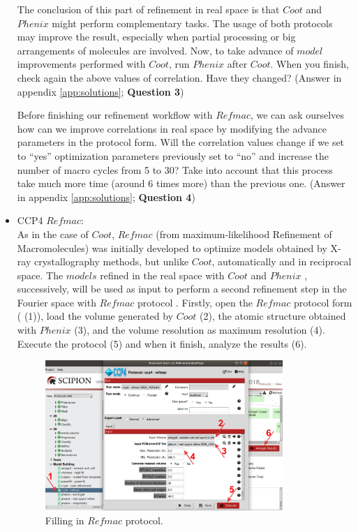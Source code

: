 \begin{itemize}
  The conclusion of this part of refinement in real space is that $Coot$ and $Phenix$  might perform complementary tasks. The usage of both protocols may improve the result, especially when partial processing or big arrangements of molecules are involved. Now, to take advance of $model$ improvements performed with $Coot$, run $Phenix$  after $Coot$. When you finish, check again the above values of correlation. Have they changed? (Answer in appendix \ref{app:solutions}; \textbf{Question 3})
  
  Before finishing our refinement workflow with $Refmac$, we can ask ourselves how can we improve correlations in real space by modifying the advance parameters in the protocol form. Will the correlation values change if we set to ``yes'' optimization parameters previously set to ``no'' and increase the number of macro cycles from 5 to 30? Take into account that this process take much more time (around 6 times more) than the previous one. (Answer in appendix \ref{app:solutions}; \textbf{Question 4})\\
  
  \item CCP4 $Refmac$:\\
  
  As in the case of $Coot$, $Refmac$ (from maximum-likelihood Refinement of Macromolecules) was initially developed to optimize models obtained by X-ray crystallography methods, but unlike $Coot$, automatically and in reciprocal space. The $models$ refined in the real space with $Coot$ and $Phenix$ , successively, will be used as input to perform a second refinement step in the Fourier space with $Refmac$ protocol . Firstly, open the $Refmac$ protocol form ( (1)), load the volume generated by $Coot$ (2), the atomic structure obtained with $Phenix$  (3), and the volume resolution as maximum resolution (4). Execute the protocol (5) and when it finish, analyze the results (6).
  
  \begin{figure}[H]
  \centering 
  \captionsetup{width=.7\linewidth} 
  \includegraphics[width=0.85\textwidth]{Images/Fig31}
  \caption{Filling in $Refmac$ protocol.}
  \label{fig:refmac_protocol}
  \end{figure}
  

\end{itemize}
